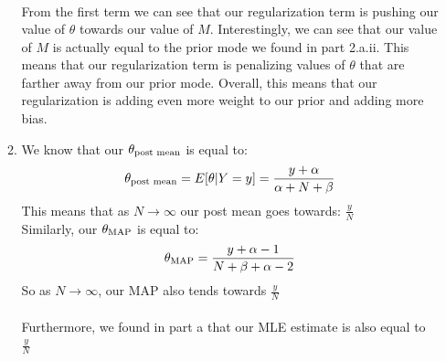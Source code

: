 \documentclass[submit]{harvardml}
\begin{document}
\begin{enumerate}
\begin{enumerate}
\begin{align*}
            \end{align*}
            From the first term we can see that our regularization term is pushing our value of $\theta$ towards our value of $M$. Interestingly, we can see that our value of $M$ is actually equal to the prior mode we found in part 2.a.ii. This means that our regularization term is penalizing values of $\theta$ that are farther away from our prior mode. Overall, this means that our regularization is adding even more weight to our prior and adding more bias.\\
            \item
            We know that our $\theta_{\textnormal{post mean}}$ is equal to:
            $$\theta_{\textnormal{post mean}} = E[\theta | Y=y] = \frac{y+\alpha}{\alpha + N + \beta}$$
            This means that as $N \rightarrow \infty$ our post mean goes towards: $\boxed{\frac{y}{N}}$\\
            Similarly, our $\theta_{\textnormal{MAP}}$ is equal to:\\
            $$\theta_{\textnormal{MAP}} = \frac{y+\alpha-1}{N+\beta + \alpha-2}$$
            So as $N \rightarrow \infty$, our MAP also tends towards $\boxed{\frac{y}{N}}$\\
            \\
            Furthermore, we found in part a that our MLE estimate is also equal to $\boxed{\frac{y}{N}}$
        \end{enumerate}
\end{enumerate}

\newpage

\end{document}
